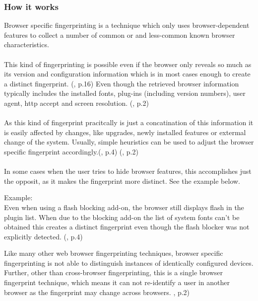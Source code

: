 \subsubsection{How it works}
Browser specific fingerprinting is a technique which only uses browser-dependent features to collect a number of common or and less-common known browser characteristics.\\\\
This kind of fingerprinting is possible even if the browser only reveals so much as its version and configuration information which is in most cases enough to create a distinct fingerprint. (\textcite{eckersley10}, p.16) Even though the retrieved browser information typically includes the installed fonts, plug-ins (including version numbers), user agent, http accept and screen resolution. (\textcite{upi15}, p.2)\\\\
As this kind of fingerprint pracitcally is just a concatination of this information it is easily affected by changes, like upgrades, newly installed features or extermal change of the system.
Usually, simple heuristics can be used to adjust the browser specific fingerprint accordingly.(\textcite{eckersley10}, p.4) (\textcite{upi15}, p.2)\\\\
In some cases when the user tries to hide browser features, this accomplishes just the opposit, as it makes the fingerprint more distinct. See the example below.\\
\begin{tcolorbox}
	Example: \\
	Even when using a flash blocking add-on, the browser still displays flash in the plugin list. When due to the blocking add-on the list of system fonts can't be obtained this creates a distinct fingerprint even though the flash blocker was not explicitly detected. (\textcite{eckersley10}, p.4)
\end{tcolorbox}
Like many other web browser fingerprinting techniques, browser specific fingerprinting is not able to distinguish instances of identically configured devices. Further, other than cross-browser fingerprinting, this is a single browser fingerprint technique, which means it can not re-identify a user in another browser as the fingerprint may change across browsers. \textcite{upi15}, p.2)

